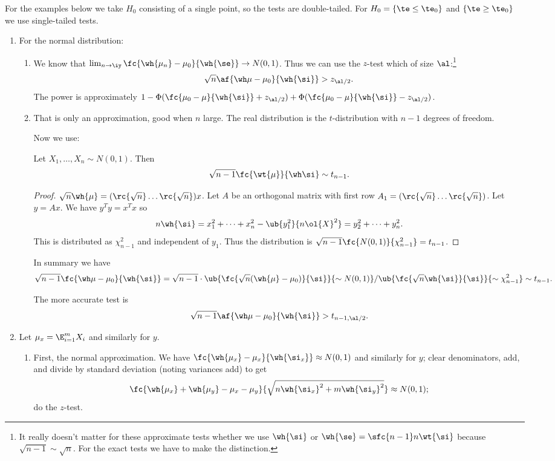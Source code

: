 For the examples below we take $H_0$ consisting of a single point, so the tests are double-tailed. For $H_0=\{\te\le \te_0\}$ and $\{\te\ge \te_0\}$ we use single-tailed tests.
\begin{enumerate}
\item
For the normal distribution:
\begin{enumerate}
\item
We know that $\lim_{n\to \iy}\fc{\wh{\mu_n}-\mu_0}{\wh{\se}}\to N(0,1)$. Thus we can use the $z$-test which of size $\al$:\footnote{It really doesn't matter for these approximate tests whether we use $\wh{\si}$ or $\wh{\se}=\sfc{n-1}n\wt{\si}$ because $\sqrt{n-1}\sim \sqrt{n}$. For the exact tests we have to make the distinction.}
\[
\sqrt{n}\af{\wh\mu-\mu_0}{\wh{\si}}
>z_{\al/2}.
\]
The power is approximately $1-\Phi(\fc{\mu_0-\mu}{\wh{\si}}+z_{\al/2})+\Phi(\fc{\mu_0-\mu}{\wh{\si}}-z_{\al/2})$. 
\item
That is only an approximation, good when $n$ large. The real distribution is the $t$-distribution with $n-1$ degrees of freedom. 

Now we use:
\begin{lem}
Let $X_1,\ldots, X_n\sim N(0,1)$. Then 
\[
\sqrt{n-1}\fc{\wt{\mu}}{\wh\si} \sim t_{n-1}.
\]
\end{lem}
\begin{proof}
$\sqrt n\wh{\mu}=(\rc{\sqrt n}\ldots \rc{\sqrt n})x$. Let $A$ be an orthogonal matrix with first row $A_1=(\rc{\sqrt n}\ldots \rc{\sqrt n})$. Let $y=Ax$. We have $y^Ty=x^Tx$ so 
\[n\wh{\si}=x_1^2+\cdots +x_n^2-\ub{y_1^2}{n\ol{X}^2}=y_2^2+\cdots +y_n^2.\]
This is distributed as $\chi^2_{n-1}$ and independent of $y_1$. Thus the distribution is $\sqrt{n-1}\fc{N(0,1)}{\chi_{n-1}^2}=t_{n-1}$.
\end{proof}
In summary we have
\[
\sqrt{n-1}\fc{\wh\mu-\mu_0}{\wh{\si}} = 
\sqrt{n-1} \cdot 
\ub{\fc{\sqrt n(\wh{\mu}-\mu_0)}{\si}}{\sim N(0,1)}
/ \ub{\fc{\sqrt n \wh{\si}}{\si}}{\sim \chi_{n-1}^2} \sim t_{n-1}.
\]

The more accurate test is
\[
\sqrt{n-1}\af{\wh\mu-\mu_0}{\wh{\si}}>t_{n-1,\al/2}.
\]
\end{enumerate}
\item Let $\mu_x=\E_{i=1}^m X_i$ and similarly for $y$.
\begin{enumerate}
\item
First, the normal approximation. We have $\fc{\wh{\mu_x}-\mu_x}{\wh{\si_x}}\approx N(0,1)$ and similarly for $y$; clear denominators, add, and divide by standard deviation (noting variances add) to get
\[
\fc{\wh{\mu_x}+\wh{\mu_y}-\mu_x-\mu_y}{\sqrt{n\wh{\si_x}^2+m\wh{\si_y}^2}} \approx N(0,1);
\]
do the $z$-test.


\end{enumerate}
\end{enumerate}
